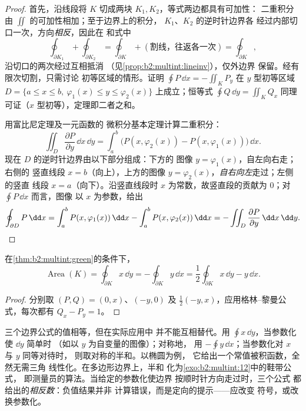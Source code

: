 \begin{proof}
首先，沿线段将 $K$
切成两块 $K_1, K_2$，等式两边都具有可加性：
二重积分由 $\iint$ 的可加性相加；至于边界上的积分，
$K_1$、$K_2$ 的逆时针边界各
经过内部切口一次，方向\emph{相反}，因此在
和式中
\[
\oint_{\partial K_1} + \oint_{\partial K_2}
= \oint_{\partial K} + (\text{割线，往返各一次})
= \oint_{\partial K},
\]
沿切口的两次经过互相抵消
（见\cref{prop:b2:multint:lineinv}），仅外边界
保留。经有限次切割，只需讨论
初等区域的情形。证明 $\oint P\,\dd x = -\iint_K P_y$ 在
$y$ 型初等区域 $D = \{a \leq x \leq b,\ \varphi_1(x) \leq y
\leq \varphi_2(x)\}$ 上成立；恒等式 $\oint Q\,\dd y = \iint_K Q_x$
同理可证（$x$ 型初等），定理即二者之和。

用富比尼定理及一元函数的
微积分基本定理计算二重积分：
\[
\iint_D \frac{\partial P}{\partial y}\,\dd x\,\dd y
= \int_a^b \bigl(P(x, \varphi_2(x)) - P(x, \varphi_1(x))\bigr)
\,\dd x .
\]
现在 $D$ 的逆时针边界由以下部分组成：下方的
图像 $y = \varphi_1(x)$，自左向右走；右侧的
竖直线段 $x = b$（向上），上方的图像 $y =
\varphi_2(x)$，\emph{自右向左}走过；左侧的竖直
线段 $x = a$（向下）。沿竖直线段时 $x$
为常数，故竖直段的贡献为 $0$；对 $\oint P\,\dd x$ 而言，图像
以 $x$ 为参数，给出
\[
\oint_{\partial D} P\,\dd x
= \int_a^b P(x, \varphi_1(x))\,\dd x
- \int_a^b P(x, \varphi_2(x))\,\dd x
= -\iint_D \frac{\partial P}{\partial y}\,\dd x\,\dd y .
\qedhere
\]
\end{proof}

\begin{corollary}[由边界求面积]\label{cor:b2:multint:area}
在\cref{thm:b2:multint:green}的条件下，
\[
\operatorname{Area}(K)
= \oint_{\partial K} x\,\dd y
= -\oint_{\partial K} y\,\dd x
= \frac12\oint_{\partial K} x\,\dd y - y\,\dd x .
\]
\end{corollary}

\begin{proof}
分别取 $(P, Q) = (0, x)$、$(-y, 0)$ 及
$\frac12(-y, x)$，应用格林–黎曼公式，每次都有 $Q_x - P_y = 1$。
\end{proof}

\begin{remark}[三种面积公式的选取]
三个边界公式的值相等，但在实际应用中
并不能互相替代。用 $\oint x\,\dd y$，当参数化使 $\dd y$ 简单时
（如以 $y$ 为自变量的图像）；对称地，
用 $-\oint y\,\dd x$；当参数化对 $x$ 与 $y$ 同等对待时，
则取对称的半和。以椭圆为例，
它给出一个常值被积函数，全然无需三角
线性化。在多边形边界上，半和
化为\cref{exo:b2:multint:12}中的鞋带公式，
即测量员的算法。当给定的参数化使边界
按顺时针方向走过时，三个公式
都给出的\emph{相反数}：负值结果并非
计算错误，而是定向的提示——应改变
符号，或改换参数化。
\end{remark}

